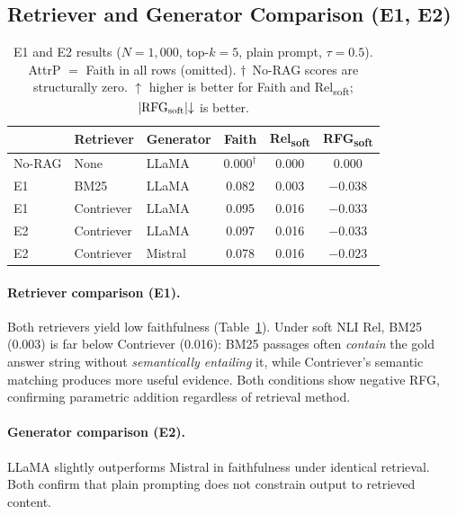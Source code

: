 \documentclass[11pt]{article}
\begin{document}
\subsection{Retriever and Generator Comparison (E1, E2)}

\begin{table}[t]
\centering
\small
\setlength{\tabcolsep}{4pt}
\begin{tabular}{@{} l l l c c c @{}}
\toprule
\textbf{} & \textbf{Retriever} & \textbf{Generator}
  & \textbf{Faith}
  & \textbf{Rel\textsubscript{soft}} & \textbf{RFG\textsubscript{soft}} \\
\midrule
No-RAG & None & LLaMA
  & $0.000^{\dagger}$ & 0.000 & 0.000 \\
\midrule
E1 & BM25       & LLaMA   & 0.082 & 0.003 & $-0.038$ \\
E1 & Contriever & LLaMA   & 0.095 & 0.016 & $-0.033$ \\
\midrule
E2 & Contriever & LLaMA   & 0.097 & 0.016 & $-0.033$ \\
E2 & Contriever & Mistral & 0.078 & 0.016 & $-0.023$ \\
\bottomrule
\end{tabular}
\caption{
  E1 and E2 results ($N{=}1{,}000$, top-$k{=}5$, plain prompt, $\tau{=}0.5$).
  AttrP $=$ Faith in all rows (omitted).
  $\dagger$~No-RAG scores are structurally zero.
  $\uparrow$ higher is better for Faith and Rel\textsubscript{soft};
  $|\text{RFG}\textsubscript{soft}|{\downarrow}$ is better.
}
\label{tab:e1e2}
\end{table}

\paragraph{Retriever comparison (E1).}
Both retrievers yield low faithfulness (Table~\ref{tab:e1e2}).
Under soft NLI Rel, BM25 (0.003) is far below Contriever (0.016):
BM25 passages often \emph{contain} the gold answer string without
\emph{semantically entailing} it, while Contriever's semantic matching
produces more useful evidence.
Both conditions show negative RFG, confirming parametric addition regardless
of retrieval method.

\paragraph{Generator comparison (E2).}
LLaMA slightly outperforms Mistral in faithfulness under identical retrieval.
Both confirm that plain prompting does not constrain output to retrieved content.
\end{document}
